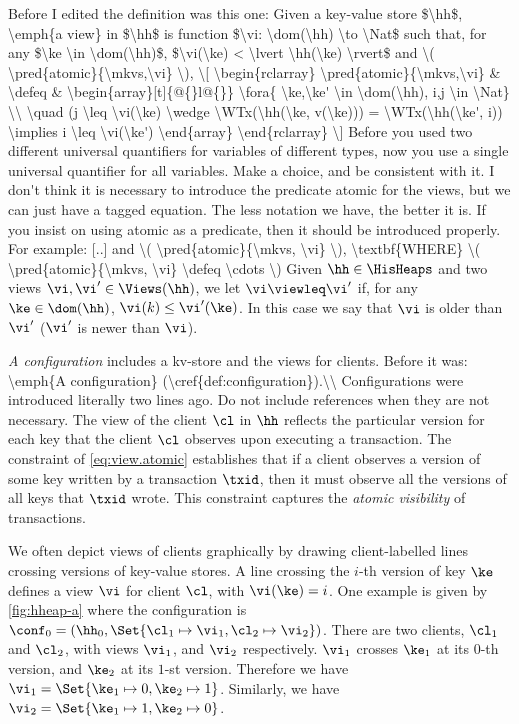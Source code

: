 \ac{Before I edited the definition was this one: 
Given a key-value store $\hh$, \emph{a view} in $\hh$ is function  
$\vi: \dom(\hh) \to \Nat$ such that, for any $\ke \in \dom(\hh)$, 
$\vi(\ke) < \lvert \hh(\ke) \rvert$ 
and \( \pred{atomic}{\mkvs,\vi} \),
\[
\begin{rclarray}
\pred{atomic}{\mkvs,\vi} & \defeq &
\begin{array}[t]{@{}l@{}}
\fora{ \ke,\ke' \in \dom(\hh), i,j \in \Nat} \\
\quad (j \leq \vi(\ke) \wedge 
\WTx(\hh(\ke, v(\ke))) = \WTx(\hh(\ke', i)) \implies i \leq \vi(\ke')
\end{array}
\end{rclarray}
\]
Before you used two different universal quantifiers for variables of different types, 
now you use a single universal quantifier for all variables. Make a choice, and be consistent 
with it. I don't think it is necessary to introduce the predicate atomic for the views, 
but we can just have a tagged equation. The less notation we have, the better it is. 
If you insist on using atomic as a predicate, then it should be introduced properly. 
For example: [..] and \( \pred{atomic}{\mkvs, \vi} \), \textbf{WHERE} \( \pred{atomic}{\mkvs, \vi} \defeq \cdots \)
}
Given $\hh \in \HisHeaps$ and two views $\vi, \vi' \in \Views(\hh)$, 
we let $\vi \viewleq \vi'$ if, for any $\ke \in \dom(\hh)$, $\vi(k) \leq \vi'(\ke)$. 
In this case we say that $\vi$ is older than $\vi'$ ($\vi'$ is newer than $\vi$).

\emph{A configuration}
includes a kv-store and the views for clients.
\ac{Before it was: \emph{A configuration} (\cref{def:configuration}).\\
Configurations were introduced literally two lines ago. Do not include references when 
they are not necessary.}
The view of the client $\cl$ in $\hh$ reflects the particular version for each key 
that the client \(\cl \) observes upon executing a transaction. 
The constraint of \cref{eq:view.atomic} establishes that if a client observes 
a version of some key written by a transaction $\txid$, then it must observe all the versions of 
all keys that $\txid$ wrote. This constraint captures the \emph{atomic visibility} of transactions.

We often depict views of clients graphically by drawing client-labelled lines crossing 
versions of key-value stores. A line crossing the $i$-th version of key $\ke$ defines a view 
$\vi$ for client $\cl$, with $\vi(\ke) = i$. One example is given by \cref{fig:hheap-a} where the configuration is
$\conf_0 = (\hh_0, \Set{\cl_1 \mapsto \vi_1, \cl_2 \mapsto \vi_2})$. 
There are two clients, 
$\cl_1$ and $\cl_2$, with views $\vi_1$, and $\vi_2$ respectively. $\vi_1$ crosses $\ke_1$ at its $0$-th 
version, and $\ke_2$ at its $1$-st version. Therefore we have $\vi_1 = \Set{\ke_1 \mapsto 0, \ke_2 \mapsto 1}$. 
Similarly, we have $\vi_2 = \Set{\ke_1 \mapsto 1, \ke_2 \mapsto 0}$. 

